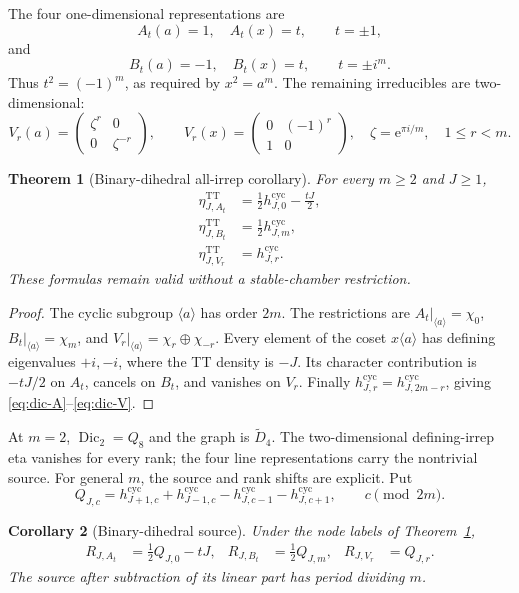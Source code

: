 \documentclass[11pt]{article}
\newtheorem{theorem}{Theorem}[section]
\newtheorem{corollary}[theorem]{Corollary}
\theoremstyle{definition}
\newcommand{\TT}{\mathrm{TT}}
\newcommand{\e}{\mathrm e}
\begin{document}
The four one-dimensional representations are
\[
 A_t(a)=1,\quad A_t(x)=t,\qquad t=\pm1,
\]
and
\[
 B_t(a)=-1,\quad B_t(x)=t,\qquad t=\pm i^m.
\]
Thus $t^2=(-1)^m$, as required by $x^2=a^m$.
The remaining irreducibles are two-dimensional:
\[
 V_r(a)=\begin{pmatrix}\zeta^r&0\\0&\zeta^{-r}\end{pmatrix},
 \qquad
 V_r(x)=\begin{pmatrix}0&(-1)^r\\1&0\end{pmatrix},
 \quad \zeta=\e^{\pi i/m},\quad1\leq r<m.
\]

\begin{theorem}[Binary-dihedral all-irrep corollary]
\label{thm:dic}
For every $m\geq2$ and $J\geq1$,
\begin{align}
 \eta^{\TT}_{J,A_t}&=\frac12h^{\mathrm{cyc}}_{J,0}-\frac{tJ}{2},
 \label{eq:dic-A}\\
 \eta^{\TT}_{J,B_t}&=\frac12h^{\mathrm{cyc}}_{J,m},
 \label{eq:dic-B}\\
 \eta^{\TT}_{J,V_r}&=h^{\mathrm{cyc}}_{J,r}.
 \label{eq:dic-V}
\end{align}
These formulas remain valid without a stable-chamber restriction.
\end{theorem}

\begin{proof}
The cyclic subgroup $\langle a\rangle$ has order $2m$.  The restrictions are
$A_t|_{\langle a\rangle}=\chi_0$,
$B_t|_{\langle a\rangle}=\chi_m$, and
$V_r|_{\langle a\rangle}=\chi_r\oplus\chi_{-r}$.
Every element of the coset $x\langle a\rangle$ has defining eigenvalues
$+i,-i$, where the TT density is $-J$.  Its character contribution is
$-tJ/2$ on $A_t$, cancels on $B_t$, and vanishes on $V_r$.
Finally $h^{\mathrm{cyc}}_{J,r}=h^{\mathrm{cyc}}_{J,2m-r}$, giving
\eqref{eq:dic-A}--\eqref{eq:dic-V}.
\end{proof}

At $m=2$, $\operatorname{Dic}_2=Q_8$ and the graph is
$\widetilde D_4$.  The two-dimensional defining-irrep eta vanishes for every
rank; the four line representations carry the nontrivial source.  For general
$m$, the source and rank shifts are explicit.  Put
\[
 Q_{J,c}=h^{\mathrm{cyc}}_{J+1,c}
 +h^{\mathrm{cyc}}_{J-1,c}
 -h^{\mathrm{cyc}}_{J,c-1}
 -h^{\mathrm{cyc}}_{J,c+1},
 \qquad c\pmod{2m}.
\]

\begin{corollary}[Binary-dihedral source]
\label{cor:dic-source}
Under the node labels of Theorem~\ref{thm:dic},
\begin{align}
 R_{J,A_t}&=\frac12Q_{J,0}-tJ,&
 R_{J,B_t}&=\frac12Q_{J,m},&
 R_{J,V_r}&=Q_{J,r}.
 \label{eq:dic-source}
\end{align}
The source after subtraction of its linear part has period dividing $m$.
\end{corollary}
\end{document}
